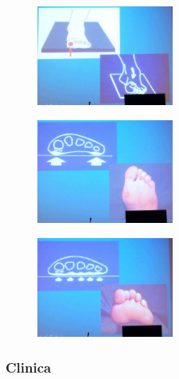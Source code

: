 \begin{figure}[!ht]
\centering
\includegraphics[width=0.4\textwidth]{017/image7.jpg}
\end{figure}

\begin{figure}[!ht]
\centering
\includegraphics[width=0.4\textwidth]{017/image8.jpg}
\end{figure}

\begin{figure}[!ht]
\centering
\includegraphics[width=0.4\textwidth]{017/image9.jpg}
\end{figure}

\subsubsection{Clinica}

